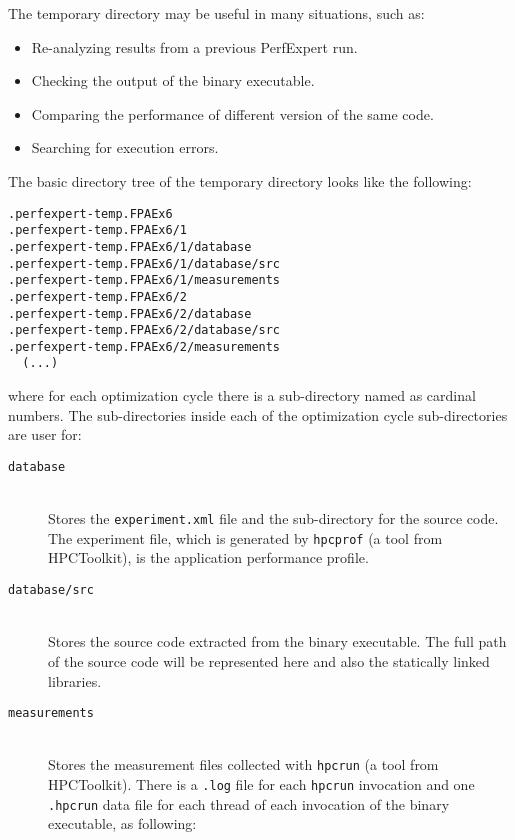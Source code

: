 The temporary directory may be useful in many situations, such as:

\begin{itemize}
	\item Re-analyzing results from a previous PerfExpert run.
	\item Checking the output of the binary executable.
	\item Comparing the performance of different version of the same code.
	\item Searching for execution errors.
\end{itemize}

The basic directory tree of the temporary directory looks like the following:

\begin{verbatim}
.perfexpert-temp.FPAEx6
.perfexpert-temp.FPAEx6/1
.perfexpert-temp.FPAEx6/1/database
.perfexpert-temp.FPAEx6/1/database/src
.perfexpert-temp.FPAEx6/1/measurements
.perfexpert-temp.FPAEx6/2
.perfexpert-temp.FPAEx6/2/database
.perfexpert-temp.FPAEx6/2/database/src
.perfexpert-temp.FPAEx6/2/measurements
  (...)
\end{verbatim}

\noindent where for each optimization cycle there is a sub-directory named as cardinal numbers. The sub-directories inside each of the optimization cycle sub-directories are user for:

\begin{description}
	\item[\texttt{database}]\hfill \\
	Stores the \texttt{experiment.xml} file and the sub-directory for the source code. The experiment file, which is generated by \texttt{hpcprof} (a tool from HPCToolkit), is the application performance profile.

	\item[\texttt{database/src}]\hfill \\
	Stores the source code extracted from the binary executable. The full path of the source code will be represented here and also the statically linked libraries.

	\item[\texttt{measurements}]\hfill \\
	Stores the measurement files collected with \texttt{hpcrun} (a tool from HPCToolkit). There is a \texttt{.log} file for each \texttt{hpcrun} invocation and one \texttt{.hpcrun} data file for each thread of each invocation of the binary executable, as following:
\end{description}

